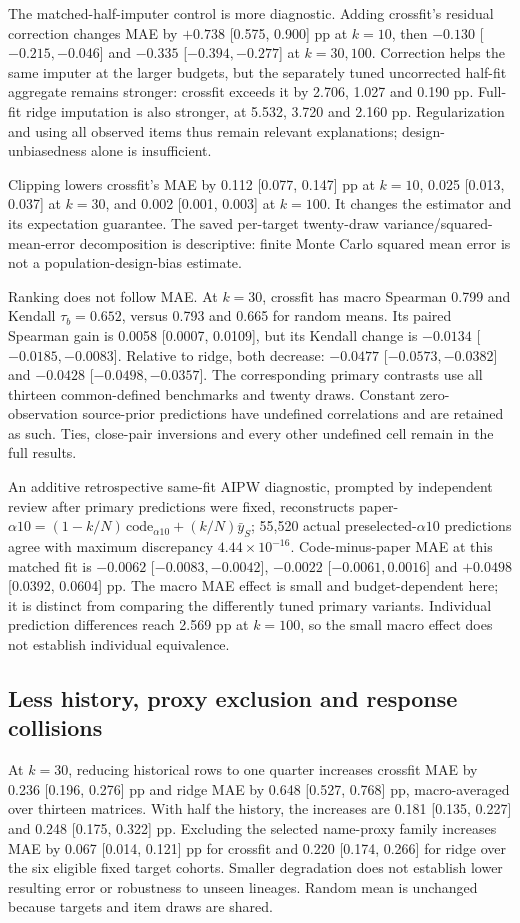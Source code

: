 \documentclass{article}
\begin{document}
The matched-half-imputer control is more diagnostic. Adding crossfit's residual correction changes MAE by $+0.738$ [0.575, 0.900] pp at $k=10$, then $-0.130$ [$-0.215,-0.046$] and $-0.335$ [$-0.394,-0.277$] at $k=30,100$. Correction helps the same imputer at the larger budgets, but the separately tuned uncorrected half-fit aggregate remains stronger: crossfit exceeds it by 2.706, 1.027 and 0.190 pp. Full-fit ridge imputation is also stronger, at 5.532, 3.720 and 2.160 pp. Regularization and using all observed items thus remain relevant explanations; design-unbiasedness alone is insufficient.

Clipping lowers crossfit's MAE by 0.112 [0.077, 0.147] pp at $k=10$, 0.025 [0.013, 0.037] at $k=30$, and 0.002 [0.001, 0.003] at $k=100$. It changes the estimator and its expectation guarantee. The saved per-target twenty-draw variance/squared-mean-error decomposition is descriptive: finite Monte Carlo squared mean error is not a population-design-bias estimate.

Ranking does not follow MAE. At $k=30$, crossfit has macro Spearman 0.799 and Kendall $\tau_b=0.652$, versus 0.793 and 0.665 for random means. Its paired Spearman gain is 0.0058 [0.0007, 0.0109], but its Kendall change is $-0.0134$ [$-0.0185,-0.0083$]. Relative to ridge, both decrease: $-0.0477$ [$-0.0573,-0.0382$] and $-0.0428$ [$-0.0498,-0.0357$]. The corresponding primary contrasts use all thirteen common-defined benchmarks and twenty draws. Constant zero-observation source-prior predictions have undefined correlations and are retained as such. Ties, close-pair inversions and every other undefined cell remain in the full results.

An additive retrospective same-fit AIPW diagnostic, prompted by independent review after primary predictions were fixed, reconstructs paper-$\alpha10=(1-k/N)\,\mathrm{code}_{\alpha10}+(k/N)\bar y_S$; 55,520 actual preselected-$\alpha10$ predictions agree with maximum discrepancy $4.44\times10^{-16}$. Code-minus-paper MAE at this matched fit is $-0.0062$ [$-0.0083,-0.0042$], $-0.0022$ [$-0.0061,0.0016$] and $+0.0498$ [0.0392, 0.0604] pp. The macro MAE effect is small and budget-dependent here; it is distinct from comparing the differently tuned primary variants. Individual prediction differences reach 2.569 pp at $k=100$, so the small macro effect does not establish individual equivalence.

\subsection{Less history, proxy exclusion and response collisions}
At $k=30$, reducing historical rows to one quarter increases crossfit MAE by 0.236 [0.196, 0.276] pp and ridge MAE by 0.648 [0.527, 0.768] pp, macro-averaged over thirteen matrices. With half the history, the increases are 0.181 [0.135, 0.227] and 0.248 [0.175, 0.322] pp. Excluding the selected name-proxy family increases MAE by 0.067 [0.014, 0.121] pp for crossfit and 0.220 [0.174, 0.266] for ridge over the six eligible fixed target cohorts. Smaller degradation does not establish lower resulting error or robustness to unseen lineages. Random mean is unchanged because targets and item draws are shared.
\end{document}
